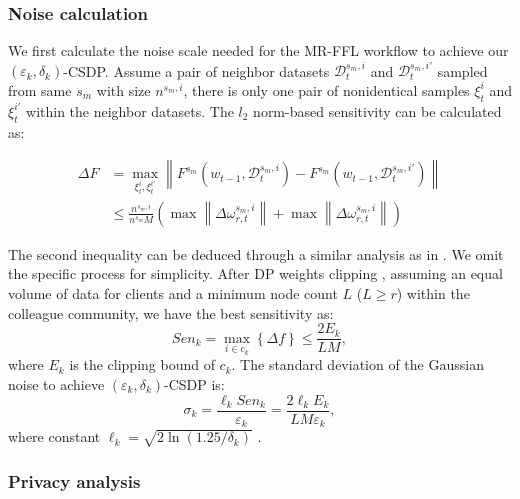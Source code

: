 \documentclass[lettersize,journal]{IEEEtran}
\begin{document}
\subsubsection{Noise calculation} We first calculate the noise scale needed for the MR-FFL workflow to achieve our $(\varepsilon_k,\delta_k)$-CSDP. Assume a pair of neighbor datasets $\mathcal{D}^{s_{m}, i}_{t}$ and $\mathcal{D}^{s_{m}, i'}_{t}$ sampled from same $s_m$ with size $n^{s_{m}, i}$, there is only one pair of nonidentical samples $\xi^{i}_{t}$ and $\xi^{i\prime}_{t}$ within the neighbor datasets. The $l_2$ norm-based sensitivity can be calculated as:

\begin{equation}
     \begin{aligned}
    \Delta F&=\max _{\xi^{i}_{t},\xi^{i\prime}_{t}}\left\|F^{s_m}\left(w_{t-1}, \mathcal{D}^{s_{m},i}_{t}\right) -F^{s_m}\left(w_{t-1}, \mathcal{D}^{s_{m},i'}_{t}\right)\right\|\\
    &\leq \frac{n^{s_{m},i}}{n^{s_{m}} M}\left(  \max \left\| \Delta\omega_{r,t}^{s_{m},i}\right\|   + \max  \left\| \Delta\omega_{r,t}^{s_{m},i}\right\| \right)
     \end{aligned}
\end{equation}

The second inequality can be deduced through a similar analysis as in \cite{wei2020federated-NbAFL}. We omit the specific process for simplicity. 
After DP weights clipping \cite{abadi2016deep}, assuming an equal volume of data for clients and a minimum node count $L$ ($L\geq r$) within the colleague community, we have the best sensitivity as:
\begin{equation}
    Sen_k=\max _{i \in c_{k}}\left\{\Delta f\right\} \leq \frac{2 E_{k}}{L M},
    \end{equation}
 where $E_k$ is the clipping bound of $c_k$.
The standard deviation of the Gaussian noise to achieve $(\varepsilon_k,\delta_k)$-CSDP is:
\begin{equation}
    \sigma_{k}=\frac{\ell_{k} Sen_k }{\varepsilon_{k}}=\frac{2 \ell_{k} E_{k}}{L M\varepsilon_{k}},
    \end{equation}
where constant $\ell_{k} =\sqrt{2 \ln (1.25 / \delta_{k})}$ \cite{dwork2014algorithmic}.

\subsubsection{Privacy analysis} 
\end{document}
